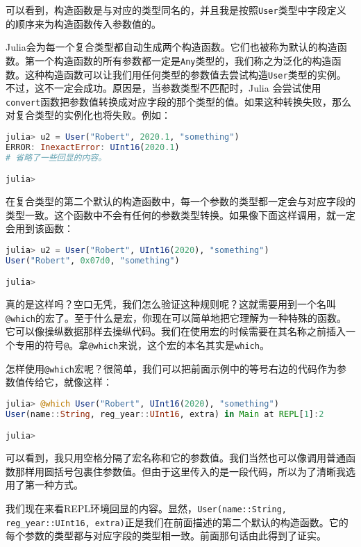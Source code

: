 可以看到，构造函数是与对应的类型同名的，并且我是按照\verb`User`类型中字段定义的顺序来为构造函数传入参数值的。

Julia会为每一个复合类型都自动生成两个构造函数。它们也被称为默认的构造函数。第一个构造函数的所有参数都一定是\verb`Any`类型的，我们称之为泛化的构造函数。这种构造函数可以让我们用任何类型的参数值去尝试构造\verb`User`类型的实例。不过，这不一定会成功。原因是，当参数类型不匹配时，Julia 会尝试使用\verb`convert`函数把参数值转换成对应字段的那个类型的值。如果这种转换失败，那么对复合类型的实例化也将失败。例如：

\begin{lstlisting}[language=julia]
julia> u2 = User("Robert", 2020.1, "something")
ERROR: InexactError: UInt16(2020.1)
# 省略了一些回显的内容。

julia> 
\end{lstlisting}

在复合类型的第二个默认的构造函数中，每一个参数的类型都一定会与对应字段的类型一致。这个函数中不会有任何的参数类型转换。如果像下面这样调用，就一定会用到该函数：

\begin{lstlisting}[language=julia]
julia> u2 = User("Robert", UInt16(2020), "something")
User("Robert", 0x07d0, "something")

julia> 
\end{lstlisting}

真的是这样吗？空口无凭，我们怎么验证这种规则呢？这就需要用到一个名叫\verb`@which`的宏了。至于什么是宏，你现在可以简单地把它理解为一种特殊的函数。它可以像操纵数据那样去操纵代码。我们在使用宏的时候需要在其名称之前插入一个专用的符号\verb`@`。拿\verb`@which`来说，这个宏的本名其实是\verb`which`。

怎样使用\verb`@which`宏呢？很简单，我们可以把前面示例中的等号右边的代码作为参数值传给它，就像这样：

\begin{lstlisting}[language=julia]
julia> @which User("Robert", UInt16(2020), "something")
User(name::String, reg_year::UInt16, extra) in Main at REPL[1]:2

julia> 
\end{lstlisting}

可以看到，我只用空格分隔了宏名称和它的参数值。我们当然也可以像调用普通函数那样用圆括号包裹住参数值。但由于这里传入的是一段代码，所以为了清晰我选用了第一种方式。

我们现在来看REPL环境回显的内容。显然，\verb`User(name::String, reg_year::UInt16, extra)`正是我们在前面描述的第二个默认的构造函数。它的每个参数的类型都与对应字段的类型相一致。前面那句话由此得到了证实。

